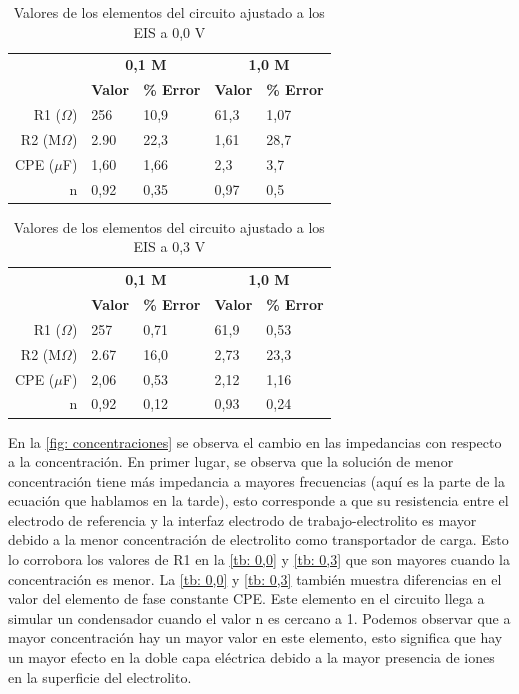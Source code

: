 \documentclass[fleqn,11pt]{SelfArx}
\begin{document}
	\begin{table}[h]
		\caption{Valores de los elementos del circuito ajustado a los EIS a 0,0 V}
		\begin{tabular}{r|ll|ll}
			& \multicolumn{2}{c}{\textbf{0,1 M}} & \multicolumn{2}{c}{\textbf{1,0 M}} \\
			& \multicolumn{1}{c}{\textbf{Valor}} & \multicolumn{1}{c}{\textbf{\% Error}} & \multicolumn{1}{c}{\textbf{Valor}} & \multicolumn{1}{c}{\textbf{\% Error}} \\
			\hline
			R1 ($\Omega$) & 256 & 10,9 & 61,3 & 1,07 \\
			R2 (M$\Omega$) & 2.90 & 22,3 & 1,61 & 28,7 \\
			CPE ($\mu$F) & 1,60 & 1,66 & 2,3 & 3,7 \\
			n & 0,92 & 0,35 & 0,97 & 0,5 \\
			\hline
		\end{tabular}
		\label{tb: 0,0}
	\end{table}
	
	\begin{table}[h]
		\caption{Valores de los elementos del circuito ajustado a los EIS a 0,3 V}
		\begin{tabular}{r|ll|ll}
			& \multicolumn{2}{c}{\textbf{0,1 M}} & \multicolumn{2}{c}{\textbf{1,0 M}} \\
			& \multicolumn{1}{c}{\textbf{Valor}} & \multicolumn{1}{c}{\textbf{\% Error}} & \multicolumn{1}{c}{\textbf{Valor}} & \multicolumn{1}{c}{\textbf{\% Error}} \\
			\hline
			R1 ($\Omega$) & 257 & 0,71 & 61,9 & 0,53 \\
			R2 (M$\Omega$) & 2.67 & 16,0 & 2,73 & 23,3 \\
			CPE ($\mu$F) & 2,06 & 0,53 & 2,12 & 1,16 \\
			n & 0,92 & 0,12 & 0,93 & 0,24 \\
			\hline
		\end{tabular}
		\label{tb: 0,3}
	\end{table}
	
	En la \autoref{fig: concentraciones} se observa el cambio en las impedancias con respecto a la concentración. En primer lugar, se observa que la solución de menor concentración tiene más impedancia a mayores frecuencias (aquí es la parte de la ecuación que hablamos en la tarde), esto corresponde a que su resistencia entre el electrodo de referencia y la interfaz electrodo de trabajo-electrolito es mayor debido a la menor concentración de electrolito \cite{suarez2011} como transportador de carga. Esto lo corrobora los valores de R1 en la \autoref{tb: 0,0} y \autoref{tb: 0,3} que son mayores cuando la concentración es menor.  La \autoref{tb: 0,0} y \autoref{tb: 0,3} también muestra diferencias en el valor del elemento de fase constante CPE. Este elemento en el circuito llega a simular un condensador cuando el valor n es cercano a 1. Podemos observar que a mayor concentración hay un mayor valor en este elemento, esto significa que hay un mayor efecto en la doble capa eléctrica debido a la mayor presencia de iones en la superficie del electrolito. 
	
\end{document}
